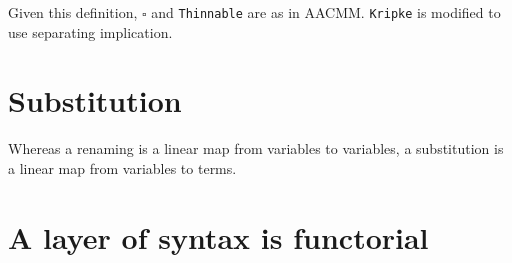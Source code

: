 
Given this definition, $\square$ and \texttt{Thinnable} are as in AACMM.
\texttt{Kripke} is modified to use separating implication.

\section{Substitution}

Whereas a renaming is a linear map from variables to variables, a substitution
is a linear map from variables to terms.

\section{A layer of syntax is functorial}
